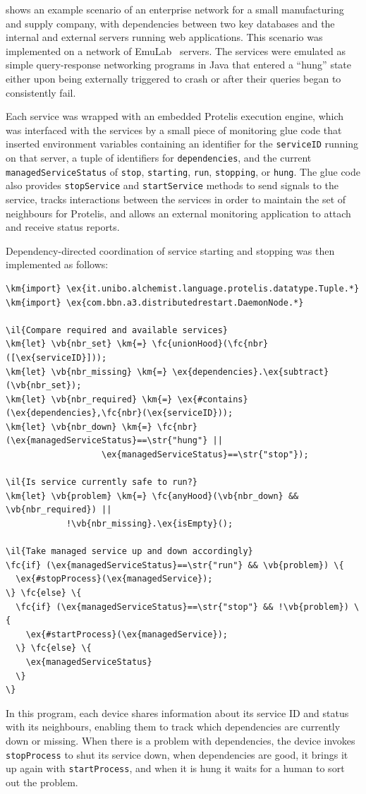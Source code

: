 \documentclass[12pt,a4paper,twoside,openright]{book}
\begin{document}
 shows an example scenario of an enterprise network for a small manufacturing and supply company, with dependencies between two key databases and the internal and external servers running web applications.
%
This scenario was implemented on a network of EmuLab~\cite{EmuLab} servers.
%
The services were emulated as simple query-response networking programs in Java that entered a ``hung'' state either upon being externally triggered to crash or after their queries began to consistently fail. 

Each service was wrapped with an embedded Protelis execution engine, which was interfaced with the services by a small piece of monitoring glue code that inserted environment variables containing an identifier for the {\tt serviceID} running on that server, a tuple of identifiers for {\tt dependencies}, and the current {\tt managedServiceStatus} of {\tt stop}, {\tt starting}, {\tt run}, {\tt stopping}, or {\tt hung}.
%
The glue code also provides {\tt stopService} and {\tt startService} methods to send signals to the service, tracks interactions between the services in order to maintain the set of neighbours for Protelis, and allows an external monitoring application to attach and receive status reports.

Dependency-directed coordination of service starting and stopping was then implemented as follows:
%
\begin{Verbatim}[samepage=true, frame=single, commandchars=\\\{\}]
\km{import} \ex{it.unibo.alchemist.language.protelis.datatype.Tuple.*}
\km{import} \ex{com.bbn.a3.distributedrestart.DaemonNode.*}

\il{Compare required and available services}
\km{let} \vb{nbr_set} \km{=} \fc{unionHood}(\fc{nbr}([\ex{serviceID}]));
\km{let} \vb{nbr_missing} \km{=} \ex{dependencies}.\ex{subtract}(\vb{nbr_set});
\km{let} \vb{nbr_required} \km{=} \ex{#contains}(\ex{dependencies},\fc{nbr}(\ex{serviceID})); 
\km{let} \vb{nbr_down} \km{=} \fc{nbr}(\ex{managedServiceStatus}==\str{"hung"} ||
                   \ex{managedServiceStatus}==\str{"stop"});

\il{Is service currently safe to run?}
\km{let} \vb{problem} \km{=} \fc{anyHood}(\vb{nbr_down} && \vb{nbr_required}) ||
            !\vb{nbr_missing}.\ex{isEmpty}();

\il{Take managed service up and down accordingly}
\fc{if} (\ex{managedServiceStatus}==\str{"run"} && \vb{problem}) \{
  \ex{#stopProcess}(\ex{managedService});
\} \fc{else} \{
  \fc{if} (\ex{managedServiceStatus}==\str{"stop"} && !\vb{problem}) \{
    \ex{#startProcess}(\ex{managedService});
  \} \fc{else} \{
    \ex{managedServiceStatus}
  \}
\}
\end{Verbatim}
In this program, each device shares information about its service ID and status with its neighbours, enabling them to track which dependencies are currently down or missing.
%
When there is a problem with dependencies, the device invokes {\tt stopProcess} to shut its service down, when dependencies are good, it brings it up again with {\tt startProcess}, and when it is hung it waits for a human to sort out the problem.
\end{document}
